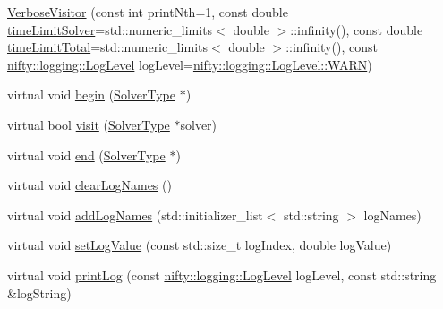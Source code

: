 \begin{DoxyCompactItemize}
\item 
\hyperlink{classnifty_1_1graph_1_1opt_1_1common_1_1VerboseVisitor_a1204cafa8df5b0b6fda89262bee6db6c}{Verbose\+Visitor} (const int print\+Nth=1, const double \hyperlink{classnifty_1_1graph_1_1opt_1_1common_1_1VerboseVisitor_a84b59607c8922f5be67b21e08adc9b5d}{time\+Limit\+Solver}=std\+::numeric\+\_\+limits$<$ double $>$\+::infinity(), const double \hyperlink{classnifty_1_1graph_1_1opt_1_1common_1_1VerboseVisitor_a60babdee8b9daa8f48f43dc6bab8c5c0}{time\+Limit\+Total}=std\+::numeric\+\_\+limits$<$ double $>$\+::infinity(), const \hyperlink{namespacenifty_1_1logging_a3385625f9a0dbb17f70c47d3fca2f64d}{nifty\+::logging\+::\+Log\+Level} log\+Level=\hyperlink{namespacenifty_1_1logging_a3385625f9a0dbb17f70c47d3fca2f64da32bd8a1db2275458673903bdb84cb277}{nifty\+::logging\+::\+Log\+Level\+::\+W\+A\+RN})
\item 
virtual void \hyperlink{classnifty_1_1graph_1_1opt_1_1common_1_1VerboseVisitor_a94bdc19115ed1cedceb2811654983293}{begin} (\hyperlink{classnifty_1_1graph_1_1opt_1_1common_1_1VisitorBase_a433d03139897d4aefe27315b2bbb3adc}{Solver\+Type} $\ast$)
\item 
virtual bool \hyperlink{classnifty_1_1graph_1_1opt_1_1common_1_1VerboseVisitor_afa21c42d9fa10fe8be09d55c4a51c49e}{visit} (\hyperlink{classnifty_1_1graph_1_1opt_1_1common_1_1VisitorBase_a433d03139897d4aefe27315b2bbb3adc}{Solver\+Type} $\ast$solver)
\item 
virtual void \hyperlink{classnifty_1_1graph_1_1opt_1_1common_1_1VerboseVisitor_ab903991aacf3d9569949c0cce466e3d8}{end} (\hyperlink{classnifty_1_1graph_1_1opt_1_1common_1_1VisitorBase_a433d03139897d4aefe27315b2bbb3adc}{Solver\+Type} $\ast$)
\item 
virtual void \hyperlink{classnifty_1_1graph_1_1opt_1_1common_1_1VerboseVisitor_a0df0016f1f72819de000a57538426969}{clear\+Log\+Names} ()
\item 
virtual void \hyperlink{classnifty_1_1graph_1_1opt_1_1common_1_1VerboseVisitor_a7ce06c6374afec8ecf6e5ceca4669682}{add\+Log\+Names} (std\+::initializer\+\_\+list$<$ std\+::string $>$ log\+Names)
\item 
virtual void \hyperlink{classnifty_1_1graph_1_1opt_1_1common_1_1VerboseVisitor_a4f01ae337ac5fedf5ad178c883cd0153}{set\+Log\+Value} (const std\+::size\+\_\+t log\+Index, double log\+Value)
\item 
virtual void \hyperlink{classnifty_1_1graph_1_1opt_1_1common_1_1VerboseVisitor_abfb4175c92ce0c98eb3c214882cde62a}{print\+Log} (const \hyperlink{namespacenifty_1_1logging_a3385625f9a0dbb17f70c47d3fca2f64d}{nifty\+::logging\+::\+Log\+Level} log\+Level, const std\+::string \&log\+String)

\end{DoxyCompactItemize}
